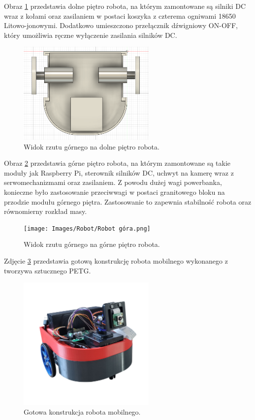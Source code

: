 \documentclass[a4paper,twoside,12pt]{book}
\begin{document}
Obraz \ref{fig:Robot dół} przedstawia dolne piętro robota, na którym zamontowane są silniki DC wraz z kołami oraz zasilaniem w postaci koszyka z czterema ogniwami 18650 Litowo-jonowymi. Dodatkowo umieszczono przełącznik dźwigniowy ON-OFF, który umożliwia ręczne wyłączenie zasilania silników DC.
\begin{figure}[h]
    \centering
    \includegraphics[width=0.6\textwidth]{Images/Robot/Robot dół.png}
    \caption{Widok rzutu górnego na dolne piętro robota.}
    \label{fig:Robot dół}
\end{figure}
\newpage
Obraz \ref{fig:Robot góra} przedstawia górne piętro robota, na którym zamontowane są takie moduły jak Raspberry Pi, sterownik silników DC, uchwyt na kamerę wraz z serwomechanizmami oraz zasilaniem. Z powodu dużej wagi powerbanka, konieczne było zastosowanie przeciwwagi w postaci granitowego bloku na przodzie modułu górnego piętra. Zastosowanie to zapewnia stabilność robota oraz równomierny rozkład masy.
\begin{figure}[h]
    \centering
    \texttt{[image: Images/Robot/Robot góra.png]}
    \caption{Widok rzutu górnego na górne piętro robota.}
    \label{fig:Robot góra}
\end{figure}
\newpage
Zdjęcie \ref{fig:Robot_gotowy} przedstawia gotową konstrukcję robota mobilnego wykonanego z tworzywa sztucznego PETG. 
\begin{figure}[h]
    \centering
    \includegraphics[width=0.6\textwidth]{Images/Robot/Robot_gotowy.png}
    \caption{Gotowa konstrukcja robota mobilnego.}
    \label{fig:Robot_gotowy}
\end{figure}
\end{document}
